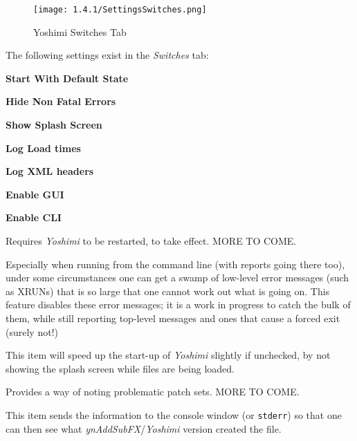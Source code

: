 \begin{figure}[H]
   \centering 
   \texttt{[image: 1.4.1/SettingsSwitches.png]}
   \caption{Yoshimi Switches Tab}
   \label{fig:yoshimi_settings_switches_tab}
\end{figure}

   The following settings exist in the \textsl{Switches} tab:

   \begin{enumber}
      \item \textbf{Start With Default State}
      \item \textbf{Hide Non Fatal Errors}
      \item \textbf{Show Splash Screen}
      \item \textbf{Log Load times}
      \item \textbf{Log XML headers}
      \item \textbf{Enable GUI}
      \item \textbf{Enable CLI}
   \end{enumber}

   \setcounter{ItemCounter}{0}      %

   Requires \textsl{Yoshimi} to be restarted, to take effect.
   MORE TO COME.

   Especially when running from the command line (with reports going there
   too), under some circumstances one can get a swamp of low-level error
   messages (such as XRUNs) that is so large that one cannot work out what is
   going on. This feature disables these error messages; it is a work in
   progress to catch the bulk of them, while still reporting top-level messages
   and ones that cause a forced exit (surely not!)

   This item will speed up the start-up of \textsl{Yoshimi} slightly
   if unchecked, by not showing the splash screen while files are being loaded.

   Provides a way of noting problematic patch sets.  MORE TO COME.

   This item sends the information to the console window
   (or \texttt{stderr}) so that
   one can then see what \textsl{ynAddSubFX}/\textsl{Yoshimi}
   version created the file.

